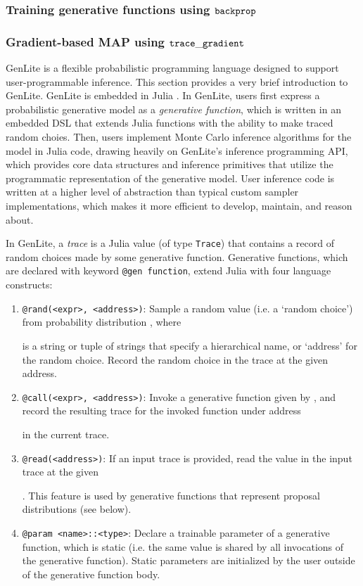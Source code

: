 

\subsubsection{Training generative functions using $\mathtt{backprop}{}$}

\subsubsection{Gradient-based MAP using $\mathtt{trace\_gradient}{}$}

GenLite \cite{TODO} is a flexible probabilistic programming language designed to support user-programmable inference.
This section provides a very brief introduction to GenLite.
GenLite is embedded in Julia \cite{TODO}.
In GenLite, users first express a probabilistic generative model as a \emph{generative function}, which is written in an embedded DSL that extends Julia functions with the ability to make traced random choies.
Then, users implement Monte Carlo inference algorithms for the model in Julia code, drawing heavily on GenLite's inference programming API, which provides core data structures and inference primitives that utilize the programmatic representation of the generative model.
User inference code is written at a higher level of abstraction than typical custom sampler implementations, which makes it more efficient to develop, maintain, and reason about.

In GenLite, a \emph{trace} is a Julia value (of type \texttt{Trace}) that contains a record of random choices made by some generative function.
Generative functions, which are declared with keyword \texttt{@gen function}, extend Julia with four language constructs:
\begin{enumerate}
\item \texttt{@rand(<expr>, <address>)}: Sample a random value (i.e. a `random choice') from probability distribution \expr{}, where \address{} is a string or tuple of strings that specify a hierarchical name, or `address' for the random choice.
Record the random choice in the trace at the given address.
\item \texttt{@call(<expr>, <address>)}: Invoke a generative function given by \expr{}, and record the resulting trace for the invoked function under address \address{} in the current trace.
\item \texttt{@read(<address>)}: If an input trace is provided, read the value in the input trace at the given \address{}.
This feature is used by generative functions that represent proposal distributions (see below).
\item \texttt{@param <name>::<type>}: Declare a trainable parameter of a generative function, which is static (i.e. the same value is shared by all invocations of the generative function).
Static parameters are initialized by the user outside of the generative function body.
\end{enumerate}

